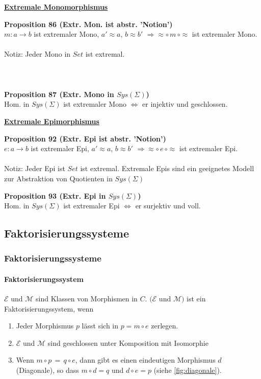 %
\begin{multicols}{2}{}

\textbf{\underline{Extremale Monomorphismus}}

\textbf{Proposition 86 (Extr. Mon. ist abstr. 'Notion') } \\
$m: a \rightarrow b$ ist extremaler Mono, $a' \approx a$, $b \approx b'$ $\Rightarrow \approx \circ \, m \, \circ \approx$ ist extremaler Mono. 
\\
\\
Notiz: Jeder Mono in $Set$ ist extremal.
\\
\\
\\
\\
\textbf{Proposition 87 (Extr. Mono in $Sys(\Sigma)$) } \\
Hom. in $Sys(\Sigma)$ ist extremaler Mono $\Leftrightarrow$  er injektiv und geschlossen.


\columnbreak
\textbf{\underline{Extremale Epimorphismus}}


\textbf{Proposition 92 (Extr. Epi ist abstr. 'Notion') } \\
$e: a \rightarrow b$ ist extremaler Epi, $a' \approx a$, $b \approx b'$ $\Rightarrow \approx \circ \, e \, \circ \approx$ ist extremaler Epi. 
\\
\\
Notiz: Jeder Epi ist $Set$ ist extremal. Extremale Epis sind ein geeignetes Modell zur Abstraktion von Quotienten in $Sys(\Sigma)$

\textbf{Proposition 93 (Extr. Epi in $Sys(\Sigma)$) } \\
Hom. in $Sys(\Sigma)$ ist extremaler Epi  $\Leftrightarrow$  er surjektiv und voll.
\end{multicols}


\subsection{Faktorisierungssysteme}

\subsubsection{Faktorisierungssysteme}

\paragraph{ Faktorisierungssystem}
$\mathcal{E}$ und $\mathcal{M}$ sind Klassen von Morphismen in $C$.
$(\mathcal{E}$ und $\mathcal{M})$ ist ein Faktorisierungssystem, wenn
\begin{enumerate}
\item Jeder Morphismus $p$ lässt sich in $p = m \circ e$ zerlegen.
\item $\mathcal{E}$ und $\mathcal{M}$ sind geschlossen unter Komposition mit Isomorphie
\item Wenn $m \circ p \, = \, q \circ e$, dann gibt es einen eindeutigen Morphismus $d$ (Diagonale), so dass $m \circ d = q$ und $d \circ e = p$ (siehe \ref{fig:diagonale}).
\end{enumerate}


